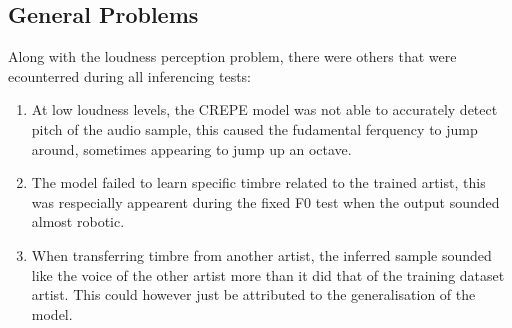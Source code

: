 \subsection{General Problems}

Along with the loudness perception problem, there were others that were ecounterred during all inferencing tests:

\begin{enumerate}
    \item At low loudness levels, the CREPE model was not able to accurately detect pitch of the audio sample, this caused the fudamental ferquency to jump around, sometimes appearing to jump up an octave.
    \item The model failed to learn specific timbre related to the trained artist, this was respecially appearent during the fixed F0 test when the output sounded almost robotic.
    \item When transferring timbre from another artist, the inferred sample sounded like the voice of the other artist more than it did that of the training dataset artist. This could however just be attributed to the generalisation of the model.
\end{enumerate}